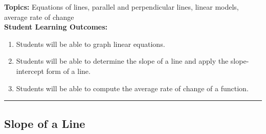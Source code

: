 

\noindent \textbf{Topics:}  Equations of lines, parallel and perpendicular lines, linear models, average rate of change\\

\noindent \textbf{Student Learning Outcomes:}
\begin{enumerate}
\item Students will be able to graph linear equations.
\item Students will be able to determine the slope of a line and apply the slope-intercept form of a line.
\item Students will be able to compute the average rate of change of a function.
\end{enumerate}

\hrule 

\bigskip

\subsection{Slope of a Line} ~

\noindent
{}

